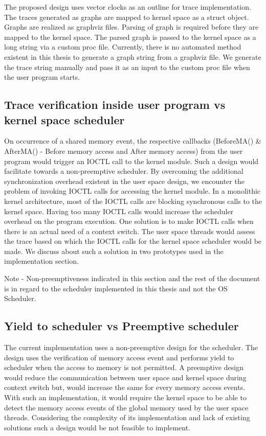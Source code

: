The proposed design uses vector clocks as an outline for trace implementation. 
The traces generated as graphs are mapped to kernel space as a struct object. 
Graphs are realized as graphviz files. 
Parsing of graph is required before they are mapped to the kernel space. 
The parsed graph is passed to the kernel space as a long string via a custom proc file. 
Currently, there is no automated method existent in this thesis to generate a graph string from a graphviz file. 
We generate the trace string manually and pass it as an input to the custom proc file when the user program starts.

\subsection{Trace verification inside user program vs kernel space scheduler}

On occurrence of a shared memory event, the respective callbacks (BeforeMA() \& AfterMA() - Before memory access and After memory access) from the user program would trigger an IOCTL call to the kernel module. 
Such a design would facilitate towards a non-preemptive scheduler. 
By overcoming the additional synchronization overhead existent in the user space design, we encounter the problem of invoking IOCTL calls  for accessing the kernel module. 
In a monolithic kernel architecture, most of the IOCTL calls are blocking synchronous calls to the kernel space. 
Having too many IOCTL calls would increase the scheduler overhead on the program execution. 
One solution is to make IOCTL calls when there is an actual need of a  context switch. 
The user space threads would assess the trace based on which the IOCTL calls for the kernel space scheduler would be made. 
We discuss about such a solution in two prototypes used in the implementation section.

Note - Non-preemptiveness indicated in this section and the rest of the document is in regard to the scheduler implemented in this thesis and not the OS Scheduler.

\subsection{Yield to scheduler vs Preemptive scheduler}

The current implementation uses a non-preemptive design for the scheduler. 
The design uses the verification of memory access event and performs yield to scheduler when the access to memory is not permitted. 
A preemptive design would reduce the communication between user space and kernel space during context switch but, would increase the same for every memory access events. 
With such an implementation, it would require the kernel space to be able to detect the memory access events of the global memory used by the user space threads. 
Considering the complexity of its implementation and lack of existing solutions such a design would be not feasible to implement. 


